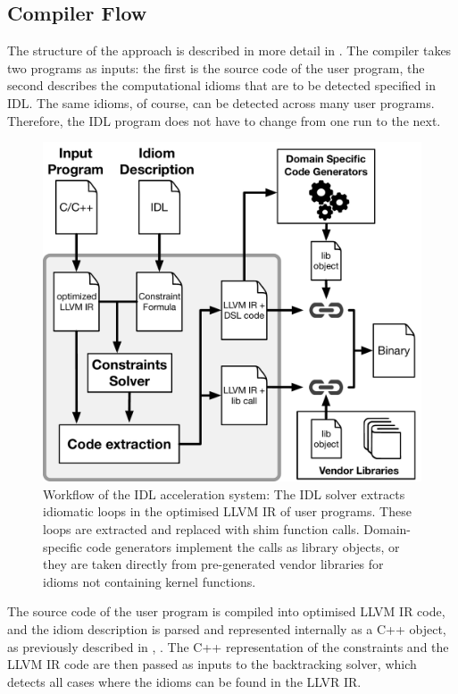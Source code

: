 \subsection{Compiler Flow}

    The structure of the approach is described in more detail in
    .
    The compiler takes two programs as inputs: the first is the source code of
    the user program, the second describes the computational idioms that are to
    be detected specified in IDL.
    The same idioms, of course, can be detected across many user programs.
    Therefore, the IDL program does not have to change from one run to the next.

\begin{figure}[p]
    \centering
    \includegraphics[width=\linewidth]{figures/compiler_flow.pdf}
    \caption{Workflow of the IDL acceleration system:
             The IDL solver extracts idiomatic loops in the optimised LLVM IR
             of user programs.
             These loops are extracted and replaced with shim function calls.
             Domain-specific code generators implement the calls as library
             objects, or they are taken directly from pre-generated vendor
             libraries for idioms not containing kernel functions.}
    \label{fig:methodology}
\end{figure}

    The source code of the user program is compiled into optimised LLVM IR code,
    and the idiom description is parsed and represented internally as a C++
    object, as previously described in ,
    .
    The C++ representation of the constraints and the LLVM IR code
    are then passed as inputs to the backtracking solver, which detects all
    cases where the idioms can be found in the LLVR IR.

